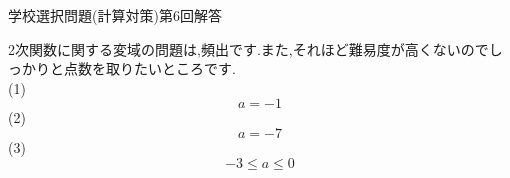 \documentclass{jsarticle}
\begin{document}
\begin{center}
学校選択問題(計算対策)第6回解答
\end{center}
2次関数に関する変域の問題は,頻出です.また,それほど難易度が高くないのでしっかりと点数を取りたいところです.
\\

(1)
\[a=-1\]
\hspace{10pt}(2)
\[a=-7\]
\hspace{10pt}(3)
\[-3\leq a \leq 0\]
\end{document}
